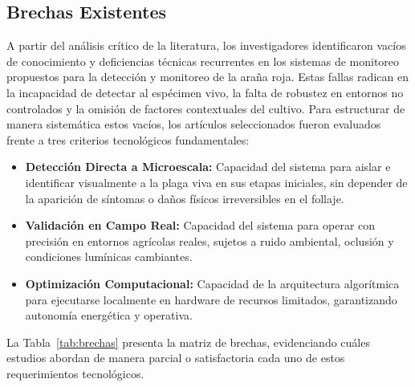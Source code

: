 \documentclass[12pt,letterpaper]{article}
\begin{document}
\subsection{Brechas Existentes}

A partir del análisis crítico de la literatura, los investigadores identificaron vacíos de conocimiento y deficiencias técnicas recurrentes en los sistemas de monitoreo propuestos para la detección y monitoreo de la araña roja. Estas fallas radican en la incapacidad de detectar al espécimen vivo, la falta de robustez en entornos no controlados y la omisión de factores contextuales del cultivo. Para estructurar de manera sistemática estos vacíos, los artículos seleccionados fueron evaluados frente a tres criterios tecnológicos fundamentales:

\begin{itemize}
    \item \textbf{Detección Directa a Microescala:} Capacidad del sistema para aislar e identificar visualmente a la plaga viva en sus etapas iniciales, sin depender de la aparición de síntomas o daños físicos irreversibles en el follaje.
    \item \textbf{Validación en Campo Real:} Capacidad del sistema para operar con precisión en entornos agrícolas reales, sujetos a ruido ambiental, oclusión y condiciones lumínicas cambiantes.
    \item \textbf{Optimización Computacional:} Capacidad de la arquitectura algorítmica para ejecutarse localmente en hardware de recursos limitados, garantizando autonomía energética y operativa.
\end{itemize}

La Tabla~\ref{tab:brechas} presenta la matriz de brechas, evidenciando cuáles estudios abordan de manera parcial o satisfactoria cada uno de estos requerimientos tecnológicos.
\end{document}
